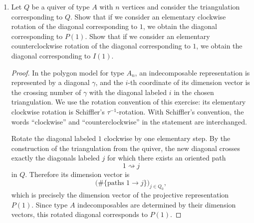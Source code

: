 \documentclass[11pt, a4paper]{article}
\begin{document}
\begin{enumerate}[leftmargin=*, label=\textbf{\arabic*.}]
\begin{proof}
Let $A=(a_{ij})$ be the arrow matrix, where $a_{ij}$ is the number of arrows from $j$ to $i$. Since $Q$ has no oriented cycles, $A$ is nilpotent after a suitable ordering of vertices. The matrix $A^m$ counts paths of length $m$. Hence the Cartan matrix is
\[
C=I+A+A^2+\cdots+A^N
\]
for $N$ sufficiently large. Since $A$ is nilpotent,
\[
(I-A)(I+A+A^2+\cdots+A^N)=I.
\]
Thus
\[
C^{-1}=I-A.
\]
Equivalently,
\[
(C^{-1})_{ij}=\begin{cases}
1,&i=j,\\
-\#\{\text{arrows }j\to i\},&i\ne j.
\end{cases}
\]
In particular, $C$ is invertible.
\end{proof}

\item Let $Q$ be a quiver of type $A$ with $n$ vertices and consider the triangulation corresponding to $Q$. Show that if we consider an elementary clockwise rotation of the diagonal corresponding to $1$, we obtain the diagonal corresponding to $P(1)$. Show that if we consider an elementary counterclockwise rotation of the diagonal corresponding to $1$, we obtain the diagonal corresponding to $I(1)$.

\begin{proof}
In the polygon model for type $A_n$, an indecomposable representation is represented by a diagonal $\gamma$, and the $i$-th coordinate of its dimension vector is the crossing number of $\gamma$ with the diagonal labeled $i$ in the chosen triangulation. We use the rotation convention of this exercise: its elementary clockwise rotation is Schiffler's $\tau^{-1}$-rotation. With Schiffler's convention, the words ``clockwise'' and ``counterclockwise'' in the statement are interchanged.

Rotate the diagonal labeled $1$ clockwise by one elementary step. By the construction of the triangulation from the quiver, the new diagonal crosses exactly the diagonals labeled $j$ for which there exists an oriented path
\[
1\rightsquigarrow j
\]
in $Q$. Therefore its dimension vector is
\[
\bigl(\#\{\text{paths }1\to j\}\bigr)_{j\in Q_0},
\]
which is precisely the dimension vector of the projective representation $P(1)$.
Since type $A$ indecomposables are determined by their dimension vectors, this rotated diagonal corresponds to $P(1)$.


\end{proof}
\end{enumerate}
\end{document}
